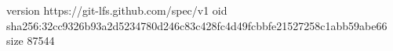 version https://git-lfs.github.com/spec/v1
oid sha256:32cc9326b93a2d5234780d246c83c428fc4d49fcbbfe21527258c1abb59abe66
size 87544
